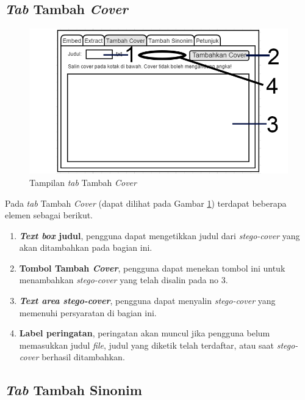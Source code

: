 \subsection{\textit{Tab} Tambah \textit{Cover}}

\begin{figure}[H]
	\centering
	\includegraphics[scale=1.8]{Gambar/tab-tambah-cover}
	\caption{Tampilan \textit{tab} Tambah \textit{Cover}} 
	\label{fig:3-tab-tambah-cover}
\end{figure}

Pada \textit{tab} Tambah \textit{Cover} (dapat dilihat pada Gambar \ref{fig:3-tab-tambah-cover}) terdapat beberapa elemen sebagai berikut.

\begin{enumerate}
	\item \textbf{\textit{Text box} judul}, pengguna dapat mengetikkan judul dari \textit{stego-cover} yang akan ditambahkan pada bagian ini.
	\item \textbf{Tombol Tambah \textit{Cover}}, pengguna dapat menekan tombol ini untuk menambahkan \textit{stego-cover} yang telah disalin pada no 3.
	\item \textbf{\textit{Text area stego-cover}}, pengguna dapat menyalin \textit{stego-cover} yang memenuhi persyaratan di bagian ini.
	\item \textbf{Label peringatan}, peringatan akan muncul jika pengguna belum memasukkan judul \textit{file}, judul yang diketik telah terdaftar, atau saat \textit{stego-cover} berhasil ditambahkan.
\end{enumerate} 

\subsection{\textit{Tab} Tambah Sinonim}

